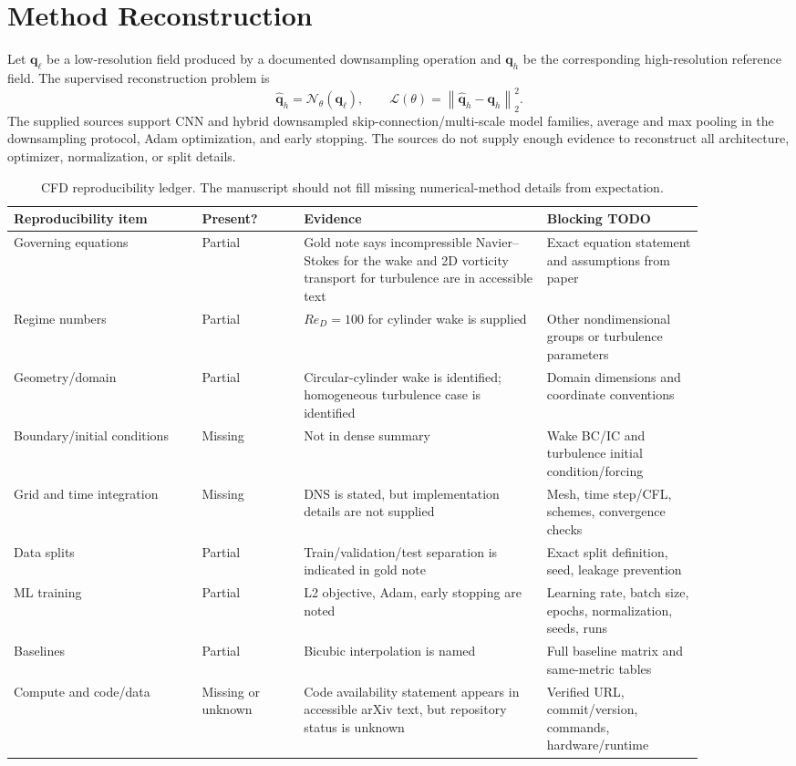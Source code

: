 \documentclass[11pt]{article}
\begin{document}
\section{Method Reconstruction}
Let $\mathbf{q}_{\ell}$ be a low-resolution field produced by a documented downsampling operation and $\mathbf{q}_{h}$ be the corresponding high-resolution reference field. The supervised reconstruction problem is
\begin{equation}
  \hat{\mathbf{q}}_{h} = \mathcal{N}_{\theta}(\mathbf{q}_{\ell}), \qquad
  \mathcal{L}(\theta) = \left\|\hat{\mathbf{q}}_{h} - \mathbf{q}_{h}\right\|_2^2.
\end{equation}
The supplied sources support CNN and hybrid downsampled skip-connection/multi-scale model families, average and max pooling in the downsampling protocol, Adam optimization, and early stopping. The sources do not supply enough evidence to reconstruct all architecture, optimizer, normalization, or split details.

\begin{table}[h]
\centering
\small
\begin{tabular}{p{0.24\linewidth}p{0.13\linewidth}p{0.31\linewidth}p{0.20\linewidth}}
\toprule
Reproducibility item & Present? & Evidence & Blocking TODO \\
\midrule
Governing equations & Partial & Gold note says incompressible Navier--Stokes for the wake and 2D vorticity transport for turbulence are in accessible text & Exact equation statement and assumptions from paper \\
Regime numbers & Partial & $Re_D=100$ for cylinder wake is supplied & Other nondimensional groups or turbulence parameters \\
Geometry/domain & Partial & Circular-cylinder wake is identified; homogeneous turbulence case is identified & Domain dimensions and coordinate conventions \\
Boundary/initial conditions & Missing & Not in dense summary & Wake BC/IC and turbulence initial condition/forcing \\
Grid and time integration & Missing & DNS is stated, but implementation details are not supplied & Mesh, time step/CFL, schemes, convergence checks \\
Data splits & Partial & Train/validation/test separation is indicated in gold note & Exact split definition, seed, leakage prevention \\
ML training & Partial & L2 objective, Adam, early stopping are noted & Learning rate, batch size, epochs, normalization, seeds, runs \\
Baselines & Partial & Bicubic interpolation is named & Full baseline matrix and same-metric tables \\
Compute and code/data & Missing or unknown & Code availability statement appears in accessible arXiv text, but repository status is unknown & Verified URL, commit/version, commands, hardware/runtime \\
\bottomrule
\end{tabular}
\caption{CFD reproducibility ledger. The manuscript should not fill missing numerical-method details from expectation.}
\label{tab:repro}
\end{table}
\end{document}
